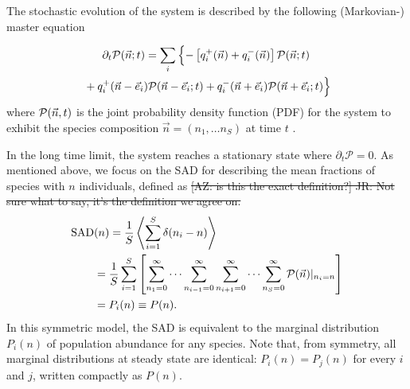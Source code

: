\documentclass[9pt,twocolumn,twoside,lineno]{pnas-new}
\begin{document}
The stochastic evolution of the system is described by the following (Markovian-) master equation
\iffalse
\begin{multline}
\label{master-eq}
\partial_t  {\rm \mathcal{P}}(\vec{n};t)= \sum_{i}\left\{ \vphantom{\left[ q^+_i\right]} q^+_i (\vec{n}-\vec{e}_i){\rm \mathcal{P}}(\vec{n}-\vec{e}_i;t) \right.\\
+q^-_i (\vec{n}+\vec{e}_i){\rm \mathcal{P}}(\vec{n}+\vec{e}_i;t)\\ 
-\left. \left[q^+_i(\vec{n})+q^-_i(\vec{n})\right]{\rm \mathcal{P}}(\vec{n};t)
\right\}
\end{multline}
\fi
\begin{multline}
\label{master-eq}
\partial_t  {\rm \mathcal{P}}(\vec{n};t)= \sum_{i}\left\{ -\left[q^+_i(\vec{n})+q^-_i(\vec{n})\right]{\rm \mathcal{P}}(\vec{n};t) \vphantom{\left[ \sum q^+_i\right]} \right.\\
\left. \vphantom{\left[ \sum q^+_i\right]} +q^+_i (\vec{n}-\vec{e}_i){\rm \mathcal{P}}(\vec{n}-\vec{e}_i;t)+q^-_i (\vec{n}+\vec{e}_i){\rm \mathcal{P}}(\vec{n}+\vec{e}_i;t)\right\}
\end{multline}
where ${\rm \mathcal{P}}(\vec{n},t)$ is the joint probability density function (PDF) for the system to exhibit the species composition $\vec{n}=(n_1,\dots n_S)$ at time $t$ \cite{gardiner1985handbook}.

In the long time limit, the system reaches a stationary state where $\partial_t \mathcal{P}=0$. As mentioned above, we focus on the SAD for describing the mean fractions of species with $n$ individuals, defined as \st{[AZ: is this the exact definition?] JR: Not sure what to say, it's the definition we agree on.}
\begin{align}
    {\rm SAD}&(n) = \frac{1}{S}\left\langle \sum_{i=1}^{S}\delta (n_i -n) \right\rangle\\
   \nonumber &=\frac{1}{S}\sum_{i=1}^S\left[ \sum_{n_1=0}^{\infty}\cdots \sum_{n_{i-1}=0}^{\infty}\sum_{n_{i+1}=0}^{\infty}\cdots \sum_{n_S=0}^{\infty}{\rm \mathcal{P}}(\vec{n})|_{n_i=n}\right] \\  &=\nonumber  P_i(n) \equiv  P(n) .
\end{align}
In this symmetric model, the SAD is equivalent to the marginal distribution $P_i(n)$ of population abundance  for any species. 
Note that, from symmetry, all marginal distributions at steady state are identical:  $P_i(n)=P_j(n)$ for every $i$ and $j$, written compactly as $P(n)$. 
\end{document}

